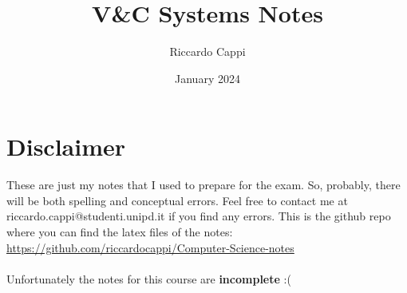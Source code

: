 \documentclass{book}
\title{V\&C Systems Notes}
\author{Riccardo Cappi}
\date{January 2024}
\begin{document}
\maketitle

\section{Disclaimer}
These are just my notes that I used to prepare for the exam. So, probably, there will be both spelling and conceptual errors. Feel free to contact me at riccardo.cappi@studenti.unipd.it if you find any errors. This is the github repo where you can find the latex files of the notes: \url{https://github.com/riccardocappi/Computer-Science-notes}\\\\
Unfortunately the notes for this course are \textbf{incomplete} :(

\tableofcontents









\end{document}
